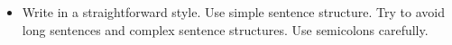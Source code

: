 \documentclass{sigchi-ext}
\begin{document}
\begin{itemize}\compresslist%
\item Write in a straightforward style. Use simple sentence
  structure. Try to avoid long sentences and complex sentence
  structures. Use semicolons carefully.

\end{itemize}






\balance{} 



\end{document}

